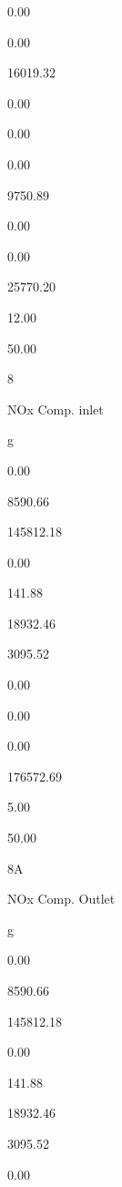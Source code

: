 \documentclass[a4paper,portrait,12pt]{article}
\begin{document}
0.00


0.00


16019.32


0.00


0.00


0.00


9750.89


0.00


0.00


25770.20


12.00


50.00





8


\begin{flushleft}
NOx Comp. inlet
\end{flushleft}


\begin{flushleft}
g
\end{flushleft}


0.00


8590.66


145812.18


0.00


141.88


18932.46


3095.52


0.00


0.00


0.00


176572.69


5.00


50.00





\begin{flushleft}
8A
\end{flushleft}


\begin{flushleft}
NOx Comp. Outlet
\end{flushleft}


\begin{flushleft}
g
\end{flushleft}


0.00


8590.66


145812.18


0.00


141.88


18932.46


3095.52


0.00
\end{document}

